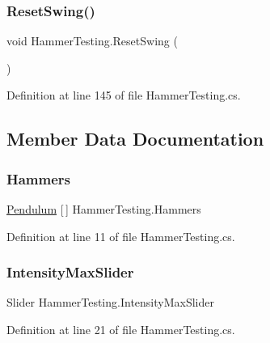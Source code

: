 \subsubsection{\texorpdfstring{Reset\+Swing()}{ResetSwing()}}
{\footnotesize\ttfamily void Hammer\+Testing.\+Reset\+Swing (\begin{DoxyParamCaption}{ }\end{DoxyParamCaption})}



Definition at line 145 of file Hammer\+Testing.\+cs.



\subsection{Member Data Documentation}
\mbox{\label{class_hammer_testing_a8e1aff0d944d99a264e9e20a1f813fd6}} 
\subsubsection{\texorpdfstring{Hammers}{Hammers}}
{\footnotesize\ttfamily \mbox{\hyperlink{class_pendulum}{Pendulum}} \mbox{[}$\,$\mbox{]} Hammer\+Testing.\+Hammers}



Definition at line 11 of file Hammer\+Testing.\+cs.

\mbox{\label{class_hammer_testing_a0a86488631345cdef404193c20cfa483}} 
\subsubsection{\texorpdfstring{Intensity\+Max\+Slider}{IntensityMaxSlider}}
{\footnotesize\ttfamily Slider Hammer\+Testing.\+Intensity\+Max\+Slider}



Definition at line 21 of file Hammer\+Testing.\+cs.

\mbox{\label{class_hammer_testing_aa005fcfd1058da129139b6072b7e771b}} 

